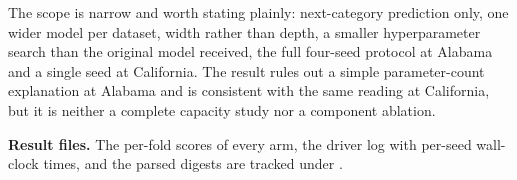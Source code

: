 The scope is narrow and worth stating plainly: next-category prediction only, one wider model per
dataset, width rather than depth, a smaller hyperparameter search than the original model received,
the full four-seed protocol at Alabama and a single seed at California. The result rules out a
simple parameter-count explanation at Alabama and is consistent with the same reading at
California, but it is neither a complete capacity study nor a component ablation.

\noindent\textbf{Result files.} The per-fold scores of every arm, the driver log with per-seed
wall-clock times, and the parsed digests are tracked under
.
